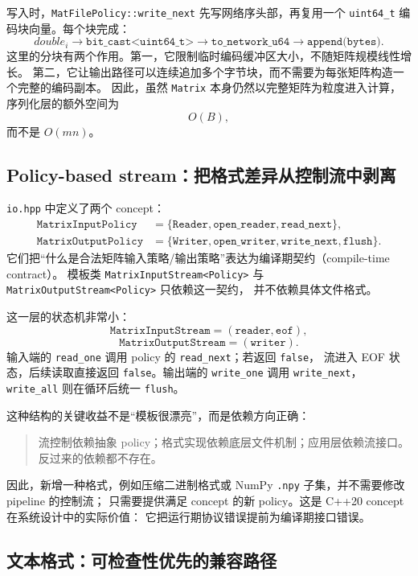 写入时，\texttt{MatFilePolicy::write\_next} 先写网络序头部，再复用一个
\texttt{uint64\_t} 编码块向量。每个块完成：
\[
    double_i \rightarrow \texttt{bit\_cast<uint64\_t>} \rightarrow \texttt{to\_network\_u64}
    \rightarrow \texttt{append(bytes)}.
\]
这里的分块有两个作用。第一，它限制临时编码缓冲区大小，不随矩阵规模线性增长。
第二，它让输出路径可以连续追加多个字节块，而不需要为每张矩阵构造一个完整的编码副本。
因此，虽然 \texttt{Matrix} 本身仍然以完整矩阵为粒度进入计算，序列化层的额外空间为
\[
    O(B),
\]
而不是 $O(mn)$。

\subsection{Policy-based stream：把格式差异从控制流中剥离}

\texttt{io.hpp} 中定义了两个 concept：
\[
    \begin{aligned}
        \texttt{MatrixInputPolicy}  & =
        \{\texttt{Reader},\texttt{open\_reader},\texttt{read\_next}\}, \\
        \texttt{MatrixOutputPolicy} & =
        \{\texttt{Writer},\texttt{open\_writer},\texttt{write\_next},\texttt{flush}\}.
    \end{aligned}
\]
它们把“什么是合法矩阵输入策略/输出策略”表达为编译期契约（compile-time contract）。
模板类 \texttt{MatrixInputStream<Policy>} 与 \texttt{MatrixOutputStream<Policy>} 只依赖这一契约，
并不依赖具体文件格式。

这一层的状态机非常小：
\[
    \texttt{MatrixInputStream}
    =
    (\texttt{reader},\texttt{eof}),
\]
\[
    \texttt{MatrixOutputStream}
    =
    (\texttt{writer}).
\]
输入端的 \texttt{read\_one} 调用 policy 的 \texttt{read\_next}；若返回 \texttt{false}，
流进入 EOF 状态，后续读取直接返回 \texttt{false}。输出端的 \texttt{write\_one} 调用
\texttt{write\_next}，\texttt{write\_all} 则在循环后统一 \texttt{flush}。

这种结构的关键收益不是“模板很漂亮”，而是依赖方向正确：

\begin{quote}
    流控制依赖抽象 policy；格式实现依赖底层文件机制；应用层依赖流接口。反过来的依赖都不存在。
\end{quote}

因此，新增一种格式，例如压缩二进制格式或 NumPy \texttt{.npy} 子集，并不需要修改 pipeline 的控制流；
只需要提供满足 concept 的新 policy。这是 C++20 concept 在系统设计中的实际价值：
它把运行期协议错误提前为编译期接口错误。

\subsection{文本格式：可检查性优先的兼容路径}

